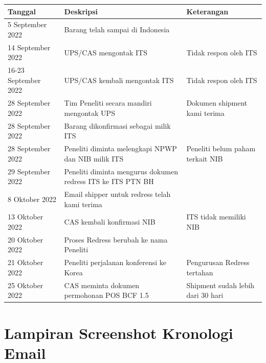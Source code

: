 \documentclass{article} %
\begin{document}
	\begin{table}[!ht]
		\begin{tabular}{|l|l|l|}
		\hline
		\textbf{Tanggal}	& \textbf{Deskripsi} & \textbf{Keterangan}  \\ \hline
		5 September 2022	& Barang telah sampai di Indonesia &  \\ \hline
		14 September 2022	& UPS/CAS mengontak ITS & Tidak respon oleh ITS \\ \hline
		16-23 September 2022	& UPS/CAS kembali mengontak ITS & Tidak respon oleh ITS \\ \hline
		28 September 2022	& Tim Peneliti secara mandiri mengontak UPS & Dokumen shipment kami terima \\ \hline
		28 September 2022	& Barang dikonfirmasi sebagai milik ITS &  \\ \hline
		28 September 2022	& Peneliti diminta melengkapi NPWP dan NIB milik ITS & Peneliti belum paham terkait NIB  \\ \hline
		29 September 2022	& Peneliti diminta mengurus dokumen redress ITS ke ITS PTN BH &  \\ \hline
		8 Oktober 2022	& Email shipper untuk redress telah kami terima &  \\ \hline
		13 Oktober 2022	& CAS kembali konfirmasi NIB &  ITS tidak memiliki NIB \\ \hline
		20 Oktober 2022 & Proses Redress berubah ke nama Peneliti &  \\ \hline
		21 Oktober 2022 & Peneliti perjalanan konferensi ke Korea & Pengurusan Redress tertahan  \\ \hline
		25 Oktober 2022 & CAS meminta dokumen permohonan POS BCF 1.5 & Shipment sudah lebih dari 30 hari   \\ \hline
		\end{tabular}
	\end{table}

	\newpage
	\section{Lampiran Screenshot Kronologi Email}
\end{document}

